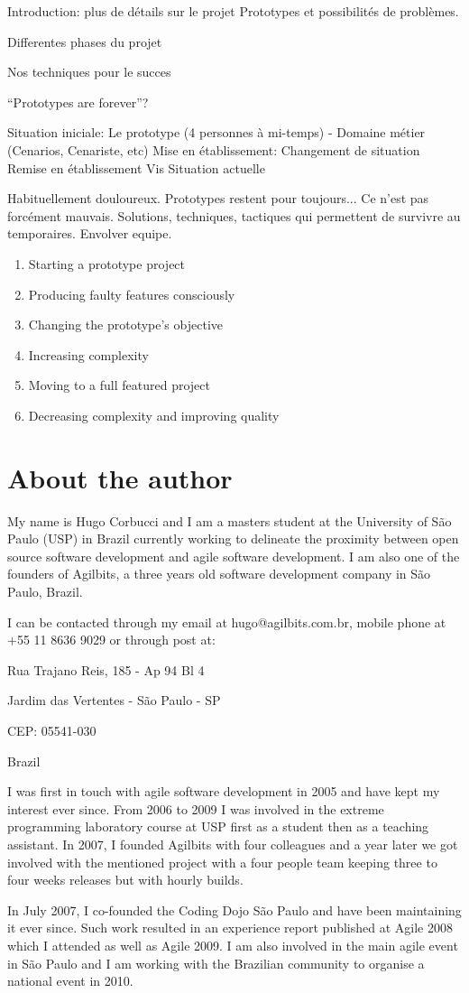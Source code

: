 \documentclass[a4paper,12pt,english]{article}
\begin{document}
Introduction: plus de détails sur le projet
Prototypes et possibilités de problèmes.

Differentes phases du projet

Nos techniques pour le succes



``Prototypes are forever''?

Situation iniciale: Le prototype (4 personnes à mi-temps) - Domaine métier (Cenarios, Cenariste, etc)
Mise en établissement:
Changement de situation
Remise en établissement
Vis
Situation actuelle

Habituellement douloureux.
Prototypes restent pour toujours... Ce n'est pas forcément mauvais.
Solutions, techniques, tactiques qui permettent de survivre au temporaires.
Envolver equipe.

\begin{enumerate}
\item Starting a prototype project
\item Producing faulty features consciously
\item Changing the prototype's objective
\item Increasing complexity
\item Moving to a full featured project
\item Decreasing complexity and improving quality
\end{enumerate}

\section{About the author}

My name is Hugo Corbucci and I am a masters student at the University
of São Paulo (USP) in Brazil currently working to delineate the
proximity between open source software development and agile software
development. I am also one of the founders of Agilbits, a three years
old software development company in São Paulo, Brazil.

I can be contacted through my email at hugo@agilbits.com.br, mobile
phone at +55 11 8636 9029 or through post at:

Rua Trajano Reis, 185 - Ap 94 Bl 4

Jardim das Vertentes - São Paulo - SP

CEP: 05541-030

Brazil

\vspace{12pt} I was first in touch with agile software development in
2005 and have kept my interest ever since. From 2006 to 2009 I was
involved in the extreme programming laboratory course at USP first as
a student then as a teaching assistant. In 2007, I founded Agilbits
with four colleagues and a year later we got involved with the
mentioned project with a four people team keeping three to four weeks
releases but with hourly builds.

In July 2007, I co-founded the Coding Dojo São Paulo and have been
maintaining it ever since. Such work resulted in an experience report
published at Agile 2008 which I attended as well as Agile 2009. I am
also involved in the main agile event in São Paulo and I am working
with the Brazilian community to organise a national event in 2010.
\end{document}
